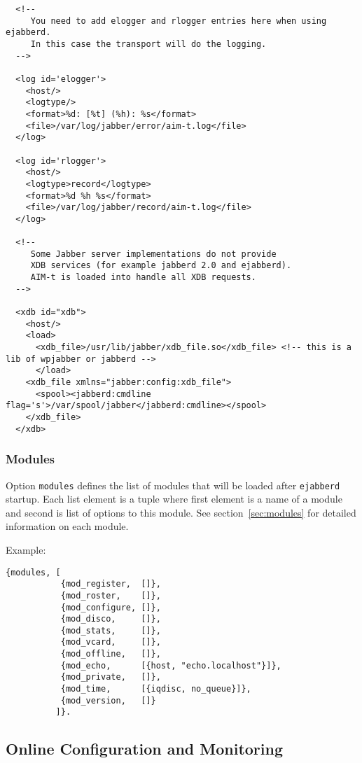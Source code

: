 \documentclass[10pt]{article}
\newcommand{\ejabberd}{\texttt{ejabberd}}
\begin{document}
\begin{verbatim}
  <!--
     You need to add elogger and rlogger entries here when using ejabberd.
     In this case the transport will do the logging.
  -->

  <log id='elogger'>
    <host/>
    <logtype/>
    <format>%d: [%t] (%h): %s</format>
    <file>/var/log/jabber/error/aim-t.log</file>
  </log>

  <log id='rlogger'>
    <host/>
    <logtype>record</logtype>
    <format>%d %h %s</format>
    <file>/var/log/jabber/record/aim-t.log</file>
  </log>

  <!--
     Some Jabber server implementations do not provide
     XDB services (for example jabberd 2.0 and ejabberd).
     AIM-t is loaded into handle all XDB requests.
  -->

  <xdb id="xdb">
    <host/>
    <load>
      <xdb_file>/usr/lib/jabber/xdb_file.so</xdb_file> <!-- this is a lib of wpjabber or jabberd -->
      </load>
    <xdb_file xmlns="jabber:config:xdb_file">
      <spool><jabberd:cmdline flag='s'>/var/spool/jabber</jabberd:cmdline></spool>
    </xdb_file>
  </xdb>
\end{verbatim}


\subsubsection{Modules}
\label{sec:configmodules}

Option \texttt{modules} defines the list of modules that will be loaded after
\ejabberd{} startup.  Each list element is a tuple where first element is a
name of a module and second is list of options to this module.  See
section~\ref{sec:modules} for detailed information on each module.

Example:
\begin{verbatim}
{modules, [
           {mod_register,  []},
           {mod_roster,    []},
           {mod_configure, []},
           {mod_disco,     []},
           {mod_stats,     []},
           {mod_vcard,     []},
           {mod_offline,   []},
           {mod_echo,      [{host, "echo.localhost"}]},
           {mod_private,   []},
           {mod_time,      [{iqdisc, no_queue}]},
           {mod_version,   []}
          ]}.
\end{verbatim}


\subsection{Online Configuration and Monitoring}
\label{sec:onlineconfig}
\end{document}
